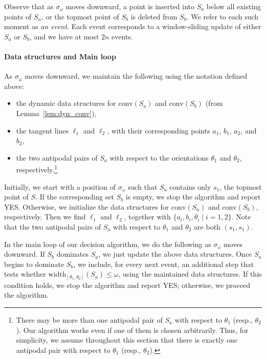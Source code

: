 \documentclass[english,a4paper, cleveref, autoref, thm-restate, nolineno]{socg-lipics-v2021}
\theoremstyle{star}
\theoremstyle{claimstar}
\newcommand{\width}{\ensuremath{\mathrm{width}}}
\newcommand{\conv}{\ensuremath{\mathrm{conv}}}
\begin{document}
Observe that as $\sigma_\omega$ moves downward, a point is inserted into $S_a$ below all existing points of $S_a$, or the topmost point of $S_b$ is deleted from $S_b$. 
We refer to each such moment as \emph{an event}. 
Each event corresponds to a window-sliding update of either $S_a$ or $S_b$, and we have at most $2n$ events.  

\paragraph*{Data structures and Main loop}
\label{par:ds_mainloop}
As $\sigma_\omega$ moves downward, we maintain the following using the notation defined above:
\begin{itemize}
    \item the dynamic data structures for $\conv(S_a)$ and $\conv(S_b)$ (from Lemma~\ref{lem:dyn_conv}),
    \item the tangent lines $\ell_1$ and $\ell_2$, with their corresponding points $a_1$, $b_1$, $a_2$, and $b_2$,
    \item the two antipodal pairs of $S_a$ with respect to the orientations $\theta_1$ and $\theta_2$, respectively.\footnote{There may be more than one antipodal pair of $S_a$ with respect to $\theta_1$ (resp., $\theta_2$). 
    Our algorithm works even if one of them is chosen arbitrarily. 
    Thus, for simplicity, we assume throughout this section that there is exactly one antipodal pair with respect to $\theta_1$ (resp., $\theta_2$).}
\end{itemize}

Initially, we start with a position of $\sigma_\omega$ such that $S_a$ contains only $s_1$, the topmost point of $S$. 
If the corresponding set $S_b$ is empty, we stop the algorithm and report YES. Otherwise, we initialize the data structures for $\conv(S_a)$ and $\conv(S_b)$, respectively.
Then we find $\ell_1$ and $\ell_2$, together with $\{a_i, b_i, \theta_i \mid i = 1, 2\}$. 
Note that the two antipodal pairs of $S_a$ with respect to $\theta_1$ and $\theta_2$ are both $(s_1, s_1)$.


In the main loop of our decision algorithm, we do the following as $\sigma_\omega$ moves downward.
If $S_b$ dominates $S_a$, we just update the above data structures.  
Once $S_a$ begins to dominate $S_b$, we include, for every next event, an additional step that tests whether $\width_{[\theta_1, \theta_2]}(S_a) \le \omega$, using the maintained data structures. If this condition holds, we stop the algorithm and report YES; otherwise, we proceed the algorithm. 
\end{document}
